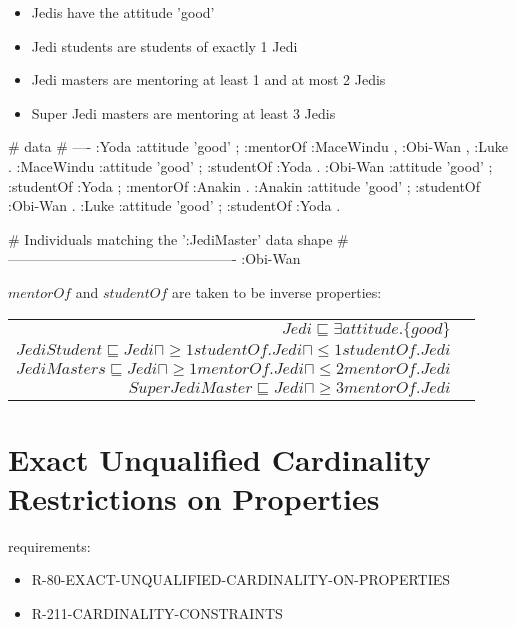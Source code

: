 \documentclass{llncs}
\newenvironment{DL}{
	\begin{center}
  \begin{tabular}{r l}

}{
  \end{tabular}
	\end{center}
}
\newcommand{\tb}[1]{\todo[size=\small, color=blue!40]{\textbf{Thomas:} #1}}
\begin{document}
\begin{itemize}
	\item Jedis have the attitude 'good'
	\item Jedi students are students of exactly 1 Jedi
	\item Jedi masters are mentoring at least 1 and at most 2 Jedis
	\item Super Jedi masters are mentoring at least 3 Jedis
\end{itemize}

\begin{ex}
# data
# ----
:Yoda 
    :attitude 'good' ;
    :mentorOf :MaceWindu , :Obi-Wan , :Luke .
:MaceWindu
    :attitude 'good' ;
    :studentOf :Yoda .
:Obi-Wan 
    :attitude 'good' ;
    :studentOf :Yoda ;
    :mentorOf :Anakin .
:Anakin
    :attitude 'good' ; 
    :studentOf :Obi-Wan .
:Luke
    :attitude 'good' ;
    :studentOf :Yoda .
\end{ex}

\begin{ex}
# Individuals matching the ’:JediMaster’ data shape
# -------------------------------------------------
:Obi-Wan
\end{ex}


\noindent $mentorOf$ and $studentOf$ are taken to be inverse properties:\\

\begin{DL}
$Jedi \sqsubseteq \exists attitude.\{good\} $\\
$JediStudent \sqsubseteq Jedi \sqcap \geq1 studentOf.Jedi \sqcap \leq1 studentOf.Jedi$ \\
$JediMasters \sqsubseteq Jedi \sqcap \geq1 mentorOf.Jedi \sqcap \leq2 mentorOf.Jedi $\\
$SuperJediMaster \sqsubseteq Jedi \sqcap  \geq3 mentorOf.Jedi $
\end{DL}

\section{Exact Unqualified Cardinality Restrictions on Properties}

requirements:

\begin{itemize}
	\item R-80-EXACT-UNQUALIFIED-CARDINALITY-ON-PROPERTIES
	\item R-211-CARDINALITY-CONSTRAINTS
\end{itemize}
\end{document}
